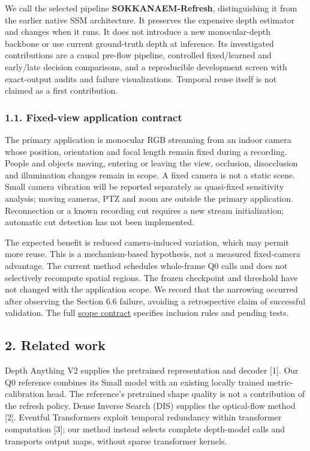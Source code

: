 \documentclass[
  10pt,
]{article}
\begin{document}
We call the selected pipeline \textbf{SOKKANAEM-Refresh}, distinguishing
it from the earlier native SSM architecture. It preserves the expensive
depth estimator and changes when it runs. It does not introduce a new
monocular-depth backbone or use current ground-truth depth at inference.
Its investigated contributions are a causal pre-flow pipeline,
controlled fixed/learned and early/late decision comparisons, and a
reproducible development screen with exact-output audits and failure
visualizations. Temporal reuse itself is not claimed as a first
contribution.

\subsubsection{1.1. Fixed-view application
contract}\label{fixed-view-application-contract}

The primary application is monocular RGB streaming from an indoor camera
whose position, orientation and focal length remain fixed during a
recording. People and objects moving, entering or leaving the view,
occlusion, disocclusion and illumination changes remain in scope. A
fixed camera is not a static scene. Small camera vibration will be
reported separately as quasi-fixed sensitivity analysis; moving cameras,
PTZ and zoom are outside the primary application. Reconnection or a
known recording cut requires a new stream initialization; automatic cut
detection has not been implemented.

The expected benefit is reduced camera-induced variation, which may
permit more reuse. This is a mechanism-based hypothesis, not a measured
fixed-camera advantage. The current method schedules whole-frame Q0
calls and does not selectively recompute spatial regions. The frozen
checkpoint and threshold have not changed with the application scope. We
record that the narrowing occurred after observing the Section 6.6
failure, avoiding a retrospective claim of successful validation. The
full \href{streaming_draft/FIXED_CAMERA_SCOPE.md}{scope contract}
specifies inclusion rules and pending tests.

\subsection{2. Related work}\label{related-work}

Depth Anything V2 supplies the pretrained representation and decoder
{[}1{]}. Our Q0 reference combines its Small model with an existing
locally trained metric-calibration head. The reference's pretrained
shape quality is not a contribution of the refresh policy. Dense Inverse
Search (DIS) supplies the optical-flow method {[}2{]}. Eventful
Transformers exploit temporal redundancy within transformer computation
{[}3{]}; our method instead selects complete depth-model calls and
transports output maps, without sparse transformer kernels.
\end{document}
